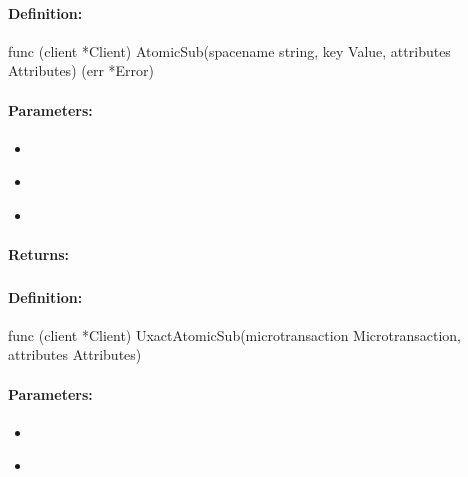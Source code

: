 \paragraph{Definition:}
\begin{gocode}
func (client *Client) AtomicSub(spacename string, key Value, attributes Attributes) (err *Error)
\end{gocode}

\paragraph{Parameters:}
\begin{itemize}[noitemsep]
\item {}\\

\item {}\\

\item {}\\

\end{itemize}

\paragraph{Returns:}


\pagebreak
\subsubsection{}
\label{api:Go:UxactAtomicSub}


\paragraph{Definition:}
\begin{gocode}
func (client *Client) UxactAtomicSub(microtransaction Microtransaction, attributes Attributes)
\end{gocode}

\paragraph{Parameters:}
\begin{itemize}[noitemsep]
\item {}\\

\item {}\\

\end{itemize}

